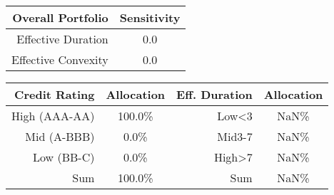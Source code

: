 \center
\begin{tabular}{r | c}
Overall Portfolio & Sensitivity \\\hline\hline
Effective Duration & 0.0 \\
Effective Convexity & 0.0 \\
\end{tabular}
\center
\begin{tabular}{r | c || r | c }
Credit Rating & Allocation & Eff. Duration & Allocation \\\hline\hline
High (AAA-AA) & 100.0\% & Low<3 & NaN\%  \\
Mid (A-BBB) & 0.0\% & Mid3-7 & NaN\%  \\
Low (BB-C) & 0.0\% & High>7 & NaN\%  \\\hline
Sum & 100.0\% & Sum & NaN\% \\
\end{tabular}
